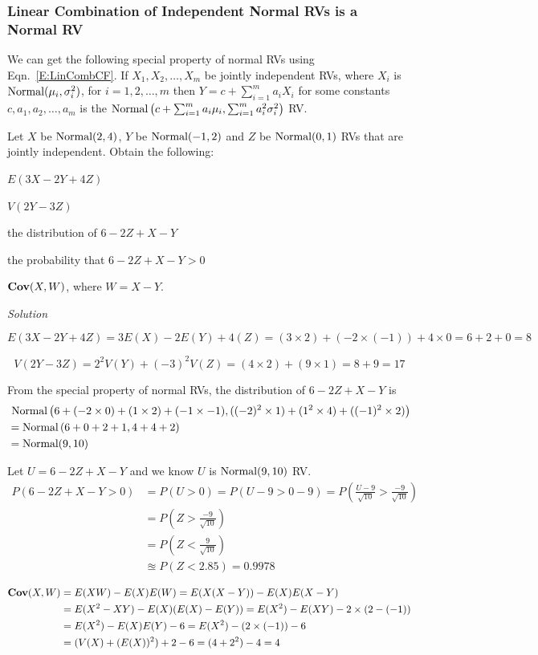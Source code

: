 \subsubsection{Linear Combination of Independent Normal RVs is a Normal RV}

We can get the following special property of normal RVs using Eqn.~\eqref{E:LinCombCF}. 
If $X_1,X_2,\ldots,X_m$ be jointly independent RVs, where $X_i$ is $\mbox{{\rm Normal}}(\mu_i,\sigma_i^2)$, for $i=1,2,\ldots,m$ 
then $Y=c+\sum_{i=1}^m a_i X_i$ for some constants $c,a_1,a_2,\ldots,a_m$ 
is the $\mbox{{\rm Normal}}\left( c+\sum_{i=1}^m a_i \mu_i, \sum_{i=1}^m a_i^2 \sigma_i^2 \right)$ RV.

\begin{example}\label{EgLinCombOfNormals}
Let $X$ be $\mbox{{\rm Normal}}(2,4)$, $Y$ be $\mbox{{\rm Normal}}(-1,2)$ and $Z$ be $\mbox{{\rm Normal}}(0,1)$ RVs that are jointly independent.  
Obtain the following:
\be
\item $E(3X-2Y+4Z)$
\item $V(2Y-3Z)$
\item the distribution of $6-2Z+X-Y$
\item the probability that $6-2Z+X-Y>0$
\item $\mathbf{Cov}(X,W)$, where $W=X-Y$.
\ee

{\em Solution}\\[4pt]
\be
\item
\[
E(3X-2Y+4Z) = 3E(X)-2E(Y)+4(Z) = (3 \times 2) + (-2 \times (-1)) + 4 \times 0 = 6 +2 +0 = 8
\]
\item
\[
V(2Y-3Z) = 2^2V(Y) + (-3)^2V(Z) = (4 \times 2) + (9 \times 1) = 8 + 9 = 17 
\]
\item
From the special property of normal RVs, the distribution of $6-2Z+X-Y$ is
\begin{align*}
&~ \mbox{{\rm Normal}}\left( 6+(-2 \times 0)+(1 \times 2)+(-1 \times -1), ((-2)^2 \times 1) + (1^2 \times 4) + ((-1)^2 \times 2)  \right)\\
&= \mbox{{\rm Normal}}\left( 6+0+2+1, 4 + 4 +  2  \right)\\
&= \mbox{{\rm Normal}}(9,10)
\end{align*}
\item 
Let $U=6-2Z+X-Y$ and we know $U$ is $\mbox{{\rm Normal}}(9,10)$ RV.
\begin{align*}
P(6-2Z+X-Y>0) 
&= P(U>0) = P(U-9>0-9) = P\left( \frac{U-9}{\sqrt{10}} > \frac{-9}{\sqrt{10}} \right)\\
&= P\left( Z > \frac{-9}{\sqrt{10}} \right)\\ 
&= P\left( Z < \frac{9}{\sqrt{10}} \right) \\
&\approxeq P(Z < 2.85) = 0.9978
\end{align*}
\item
\begin{align*}
\mathbf{Cov}(X,W) 
&= E(XW)-E(X)E(W) = E(X(X-Y))-E(X)E(X-Y)\\
&= E(X^2-XY)-E(X)(E(X)-E(Y)) = E(X^2)-E(XY)-2\times(2-(-1)) \\
&= E(X^2)-E(X)E(Y)-6 = E(X^2)-(2 \times (-1))-6\\
&= (V(X)+(E(X))^2) +2-6 = (4+2^2)-4=4
\end{align*}
\ee
\end{example}


